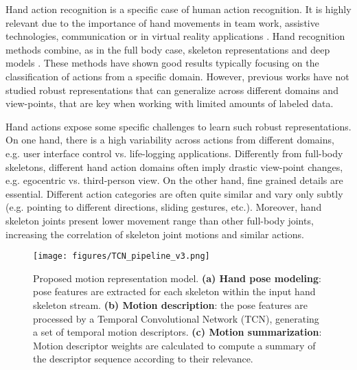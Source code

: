 \documentclass[letterpaper, 10 pt, conference]{ieeeconf}
\begin{document}
Hand action recognition is a specific case of human action recognition. It is highly relevant due to the importance of hand movements in team work, assistive technologies, communication or in virtual reality applications \cite{abbasi2019multimodal, bates2017line}. 
Hand recognition methods combine, as in the full body case, skeleton representations and deep models \cite{yang2019make, zhang2016efficient}. These methods have shown good results typically focusing  on the classification of actions from a specific domain.
However, previous works have not studied robust representations that can generalize across different domains and view-points, that are key when working with limited amounts of labeled data.  

Hand actions expose some specific challenges to learn such robust representations. 
On one hand, there is a high variability across actions from different domains, e.g. user interface control vs. life-logging applications. Differently from full-body skeletons, different hand action domains often imply drastic view-point changes, e.g. egocentric vs. third-person view. 
On the other hand, fine grained details are essential. Different action categories are often quite similar and vary only subtly (e.g. pointing to different directions, sliding gestures, etc.). 
Moreover, hand skeleton joints present lower movement range than other full-body joints, increasing the correlation of skeleton joint motions and similar actions.









\begin{figure}[!tb]
    \centering
\texttt{[image: figures/TCN\_pipeline\_v3.png]}
    \caption{Proposed motion representation model.
    \textbf{(a) Hand pose modeling}: pose features are extracted for each skeleton within the input hand skeleton stream.
    \textbf{(b) Motion description}: the pose features are processed by a Temporal Convolutional Network (TCN), generating a set of temporal motion descriptors. \textbf{(c) Motion summarization}: Motion descriptor weights are calculated to compute a summary of the descriptor sequence according to their relevance.
    }
    \label{fig:pipeline}
\end{figure}
\end{document}

